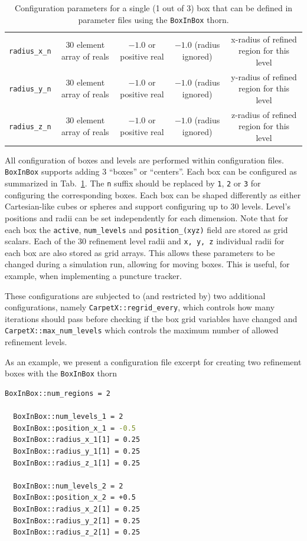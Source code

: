 \begin{table}[ht]
{\begin{tabular}{ccccc}
    \texttt{radius\_x\_n}   & 30 element array of reals & $-1.0$ or positive real                                           & $-1.0$ (radius ignored)         & x-radius of refined region for this level \\
    \texttt{radius\_y\_n}   & 30 element array of reals & $-1.0$ or positive real                                           & $-1.0$ (radius ignored)         & y-radius of refined region for this level \\
    \texttt{radius\_z\_n}   & 30 element array of reals & $-1.0$ or positive real                                           & $-1.0$ (radius ignored)         & z-radius of refined region for this level \\\hline\hline
  \end{tabular}%
  }
  \caption{Configuration parameters for a single (1 out of 3) box that can be defined in parameter files using the \texttt{BoxInBox} thorn.}
  \label{tab:box_config}
\end{table}

All configuration of boxes and levels are performed within configuration files. \texttt{BoxInBox} supports adding 3 ``boxes'' or ``centers''. Each box can be configured as summarized in Tab.~\ref{tab:box_config}. The \texttt{n} suffix should be replaced by \texttt{1}, \texttt{2} or \texttt{3} for configuring the corresponding boxes. Each box can be shaped differently as either Cartesian-like cubes or spheres and support configuring up to 30 levels. Level's positions and radii can be set independently for each dimension. Note that for each box the \texttt{active}, \texttt{num\_levels} and \texttt{position\_(xyz)} field are stored as grid scalars. Each of the 30 refinement level radii and \texttt{x, y, z} individual radii for each box are also stored as grid arrays. This allows these parameters to be changed during a simulation run, allowing for moving boxes. This is useful, for example, when implementing a puncture tracker. 

These configurations are subjected to (and restricted by) two additional \CarpetX\space configurations, namely \texttt{CarpetX::regrid\_every}, which controls how many iterations should pass before checking if the box grid variables have changed and \texttt{CarpetX::max\_num\_levels} which controls the maximum number of allowed refinement levels.

As an example, we present a configuration file excerpt for creating two refinement boxes with the \texttt{BoxInBox} thorn

\begin{lstlisting}[language=bash]
  BoxInBox::num_regions = 2

  BoxInBox::num_levels_1 = 2
  BoxInBox::position_x_1 = -0.5
  BoxInBox::radius_x_1[1] = 0.25
  BoxInBox::radius_y_1[1] = 0.25
  BoxInBox::radius_z_1[1] = 0.25

  BoxInBox::num_levels_2 = 2
  BoxInBox::position_x_2 = +0.5
  BoxInBox::radius_x_2[1] = 0.25
  BoxInBox::radius_y_2[1] = 0.25
  BoxInBox::radius_z_2[1] = 0.25
\end{lstlisting}

